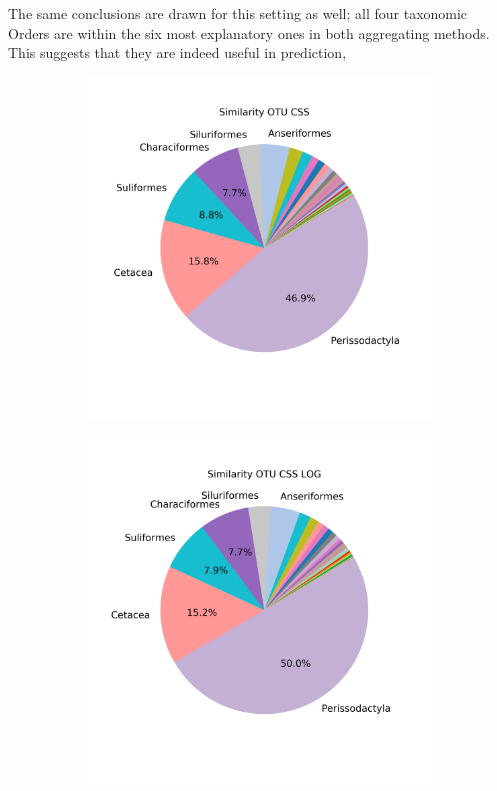 The same conclusions are drawn for this setting as well; all four taxonomic Orders are within the six most explanatory ones in both aggregating methods. This suggests that they are indeed useful in prediction,
\begin{figure}[h]
	\centering
	\begin{subfigure}{0.45\textwidth}
		\includegraphics[width=\textwidth]{rfr_dis_mean_pieOTU CSS}
		\caption{}
		\label{fig:dissimotucss}
	\end{subfigure}
	\begin{subfigure}{0.45\textwidth}
		\includegraphics[width=\textwidth]{rfr_dis_mean_pieOTU CSS LOG}

\end{subfigure}
\end{figure}
